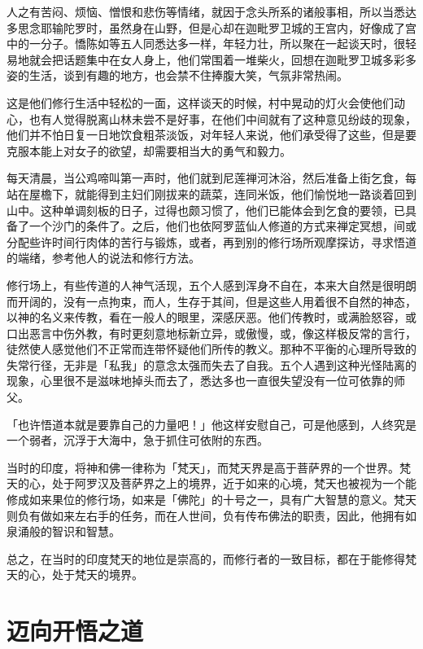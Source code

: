 \documentclass[twoside,openany]{book}
\begin{document}
人之有苦闷、烦恼、憎恨和悲伤等情绪，就因于念头所系的诸般事相，所以当悉达多思念耶输陀罗时，虽然身在山野，但是心却在迦毗罗卫城的王宫内，好像成了宫中的一分子。憍陈如等五人同悉达多一样，年轻力壮，所以聚在一起谈天时，很轻易地就会把话题集中在女人身上，他们常围着一堆柴火，回想在迦毗罗卫城多彩多姿的生活，谈到有趣的地方，也会禁不住捧腹大笑，气氛非常热闹。

这是他们修行生活中轻松的一面，这样谈天的时候，村中晃动的灯火会使他们动心，也有人觉得脱离山林未尝不是好事，在他们中间就有了这种意见纷歧的现象，他们并不怕日复一日地饮食粗茶淡饭，对年轻人来说，他们承受得了这些，但是要克服本能上对女子的欲望，却需要相当大的勇气和毅力。

每天清晨，当公鸡啼叫第一声时，他们就到尼莲禅河沐浴，然后准备上街乞食，每站在屋檐下，就能得到主妇们刚拔来的蔬菜，连同米饭，他们愉悦地一路谈着回到山中。这种单调刻板的日子，过得也颇习惯了，他们已能体会到乞食的要领，已具备了一个沙门的条件了。之后，他们也依阿罗蓝仙人修道的方式来禅定冥想，间或分配些许时间行肉体的苦行与锻炼，或者，再到别的修行场所观摩探访，寻求悟道的端绪，参考他人的说法和修行方法。

修行场上，有些传道的人神气活现，五个人感到浑身不自在，本来大自然是很明朗而开阔的，没有一点拘束，而人，生存于其间，但是这些人用着很不自然的神态，以神的名义来传教，看在一般人的眼里，深感厌恶。他们传教时，或满脸怒容，或口出恶言中伤外教，有时更刻意地标新立异，或傲慢，或，像这样极反常的言行，徒然使人感觉他们不正常而连带怀疑他们所传的教义。那种不平衡的心理所导致的失常行径，无非是「私我」的意念太强而失去了自我。五个人遇到这种光怪陆离的现象，心里很不是滋味地掉头而去了，悉达多也一直很失望没有一位可依靠的师父。

「也许悟道本就是要靠自己的力量吧！」他这样安慰自己，可是他感到，人终究是一个弱者，沉浮于大海中，急于抓住可依附的东西。

当时的印度，将神和佛一律称为「梵天」，而梵天界是高于菩萨界的一个世界。梵天的心，处于阿罗汉及菩萨界之上的境界，近于如来的心境，梵天也被视为一个能修成如来果位的修行场，如来是「佛陀」的十号之一，具有广大智慧的意义。梵天则负有做如来左右手的任务，而在人世间，负有传布佛法的职责，因此，他拥有如泉涌般的智识和智慧。

总之，在当时的印度梵天的地位是崇高的，而修行者的一致目标，都在于能修得梵天的心，处于梵天的境界。

\section{迈向开悟之道}\label{sec1.8}
\end{document}
